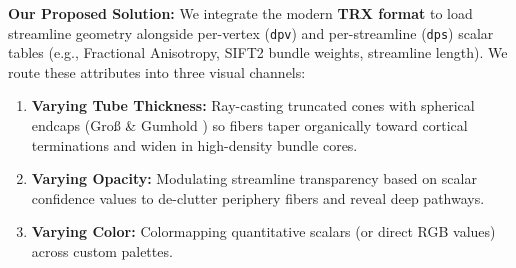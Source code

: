 \documentclass[10pt,a4paper]{article}
\begin{document}
\vspace{-0.2cm}
\noindent \textbf{Our Proposed Solution:}\newline
We integrate the modern \textbf{TRX format} \cite{trxformat} to load streamline geometry alongside per-vertex (\texttt{dpv}) and per-streamline (\texttt{dps}) scalar tables (e.g., Fractional Anisotropy, SIFT2 bundle weights, streamline length). We route these attributes into three visual channels:
\begin{enumerate}[leftmargin=*,nosep]
    \item \textbf{Varying Tube Thickness:} Ray-casting truncated cones with spherical endcaps (Gro\ss{} \& Gumhold \cite{gross2021advanced}) so fibers taper organically toward cortical terminations and widen in high-density bundle cores.
    \item \textbf{Varying Opacity:} Modulating streamline transparency based on scalar confidence values to de-clutter periphery fibers and reveal deep pathways.
    \item \textbf{Varying Color:} Colormapping quantitative scalars (or direct RGB values) across custom palettes.
\end{enumerate}
\end{document}
